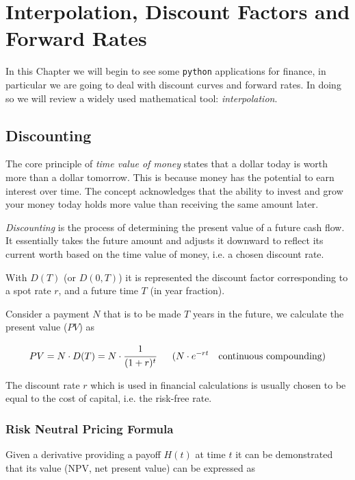 \chapter{Interpolation, Discount Factors and Forward Rates}
\label{interpolation}

In this Chapter we will begin to see some \texttt{python} applications for finance, in particular we are going to deal with discount curves and forward rates. In doing so we will review a widely used mathematical tool: \emph{interpolation}.

\section{Discounting}
\label{discount-factors}

The core principle of \emph{time value of money} states that a dollar today is worth more than a dollar tomorrow. This is because money has the potential to earn interest over time.
The concept acknowledges that the ability to invest and grow your money today holds more value than receiving the same amount later.

\emph{Discounting} is the process of determining the present value of a future cash flow. It essentially takes the future amount and adjusts it downward to reflect its current worth based on the time value of money, i.e. a chosen discount rate.

With $D(T)$ (or $D(0,T)$) it is represented the discount factor corresponding to a spot rate $r$, and a future time $T$ (in year fraction). 

Consider a payment $N$ that is to be made $T$ years in the future, we calculate the present value ($PV$) as

\begin{equation}
PV = N\cdot D(T) = N \cdot \cfrac{1}{(1 + r)^t}~~~~~
(N \cdot e^{-rt}~~~\text{continuous compounding})
\label{eq:discount_factor}
\end{equation}

The discount rate $r$ which is used in financial calculations is usually chosen to be equal to the cost of capital, i.e. the risk-free rate.

\subsection{Risk Neutral Pricing Formula}

Given a derivative providing a payoff $H(t)$ at time $t$ it can be demonstrated that its value (NPV, net present value) can be expressed as

